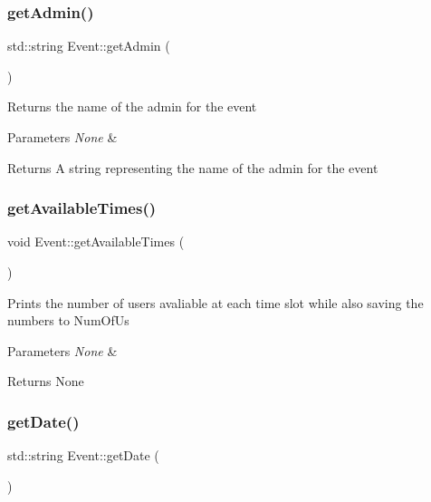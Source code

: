 \subsubsection{\texorpdfstring{get\+Admin()}{getAdmin()}}
{\footnotesize\ttfamily std\+::string Event\+::get\+Admin (\begin{DoxyParamCaption}{ }\end{DoxyParamCaption})}

Returns the name of the admin for the event 
\begin{DoxyParams}{Parameters}
{\em None} & \\
\hline
\end{DoxyParams}
\begin{DoxyReturn}{Returns}
A string representing the name of the admin for the event 
\end{DoxyReturn}
\mbox{\label{class_event_a099c123993ee717521ec411838d0f719}} 
\subsubsection{\texorpdfstring{get\+Available\+Times()}{getAvailableTimes()}}
{\footnotesize\ttfamily void Event\+::get\+Available\+Times (\begin{DoxyParamCaption}{ }\end{DoxyParamCaption})}

Prints the number of users avaliable at each time slot while also saving the numbers to Num\+Of\+Us 
\begin{DoxyParams}{Parameters}
{\em None} & \\
\hline
\end{DoxyParams}
\begin{DoxyReturn}{Returns}
None 
\end{DoxyReturn}
\mbox{\label{class_event_a1fb318a969eaf352d3f507b8097bd810}} 
\subsubsection{\texorpdfstring{get\+Date()}{getDate()}}
{\footnotesize\ttfamily std\+::string Event\+::get\+Date (\begin{DoxyParamCaption}{ }\end{DoxyParamCaption})}

